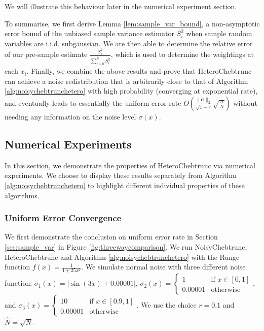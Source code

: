 \documentclass[pdflatex,sn-mathphys-num]{sn-jnl}%
\theoremstyle{thmstyleone}%
\theoremstyle{thmstyletwo}%
\theoremstyle{thmstylethree}%
\begin{document}
We will illustrate this behaviour later in the numerical experiment section. 


To summarise, we first derive Lemma \ref{lem:sample_var_bound}, a non-asymptotic error bound of the unbiased sample variance estimator $S^2_i$ when sample random variables are i.i.d. subgaussian. We are then able to determine the relative error of our pre-sample estimate $ \frac{S_i^2}{\sum_{j=0}^{\hat{N}}S_i^2}$, which is used to determine the weightings at each $x_i$. Finally, we combine the above results and prove that HeteroChebtrunc can achieve a noise redistribution that is arbitrarily close to that of Algorithm \ref{alg:noisychebtrunchetero} with high probability (converging at exponential rate), and eventually leads to essentially the uniform error rate $O(\frac{\|\bm{\sigma}\|_2}{\sqrt{1-r}}\sqrt{\frac{n}{N}})$ without needing any information on the noise level $\sigma(x)$.

\subsection{Numerical Experiments}\label{sec:num-unknown}

In this section, we demonstrate the properties of HeteroChebtrunc via numerical experiments. We choose to display these results separately from Algorithm \ref{alg:noisychebtrunchetero} to highlight different individual properties of these algorithms. 

\subsubsection{Uniform Error Convergence}

We first demonstrate the conclusion on uniform error rate in Section \ref{sec:sample_var} in Figure \ref{fig:threewaycomparison}. We run NoisyChebtrunc, HeteroChebtrunc and Algorithm \ref{alg:noisychebtrunchetero} with the Runge function $f(x) = \frac{1}{1+25x^2}$. We simulate normal noise with three different noise function: $\sigma_1(x) = |\sin(3x) + 0.00001|$, $\sigma_2(x) = \begin{cases}
	1 & \text{if } x \in [0,1]\\
	0.00001 & \text{otherwise} 
\end{cases}$, and $\sigma_3(x) = \begin{cases}
	10 & \text{if } x \in [0.9,1]\\
	0.00001 & \text{otherwise}
\end{cases}$. We use the choice $r=0.1$ and $\hat{N} = \sqrt{N}$. 
\end{document}
